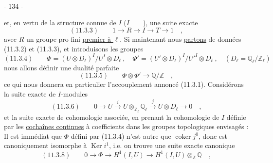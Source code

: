 \begin{center}- 134 -\end{center}

et, en vertu de la structure connue de $I$ ($I\qquad$), une suite exacte
\[
(11.3.3)\qquad 1\longrightarrow R\longrightarrow I\longrightarrow T\longrightarrow 1\quad,
\]
avec $R$ un groupe pro-fini \uline{premier à $\ell$}. Si maintenant nous \uline{partons} de données (11.3.2) et (11.3.3), et introduisons les groupes
\[
(11.3.4)\qquad \Phi=(U\otimes D_\ell)^I/U^I\otimes D_\ell\ ,\quad
\Phi'=(U'\otimes D_\ell)^I/U'^I\otimes D_\ell\ ,\quad
(D_\ell=\mathbb{Q}_\ell/\mathbb{Z}_\ell)
\]
nous allons définir une dualité parfaite
\[
(11.3.5)\qquad \Phi\otimes\Phi'\longrightarrow\mathbb{Q}/\mathbb{Z}\quad,
\]
ce qui nous donnera en particulier l'accouplement annoncé (11.3.1).
Considérons la suite exacte de $I$-modules
\[
(11.3.6)\qquad 0\longrightarrow U\xrightarrow{i}U\otimes_{\mathbb{Z}_\ell}\mathbb{Q}_\ell
\xrightarrow{j}U\otimes D_\ell\longrightarrow 0\quad,
\]
et la suite exacte de cohomologie associée, en prenant la cohomologie de $I$ définie par les \uline{cochaînes continues} à coefficients dans les groupes topologiques envisagés :
Il est immédiat que $\Phi$ défini par (11.3.4) n'est autre que $\operatorname{coker}j^0$, donc est canoniquement isomorphe à $\operatorname{Ker}i^1$, i.e. on trouve une suite exacte canonique
\[
(11.3.8)\qquad 0\longrightarrow\Phi\longrightarrow H^1(I,U)\longrightarrow H^1(I,U)\otimes_{\mathbb{Z}}\mathbb{Q}\quad,
\]
